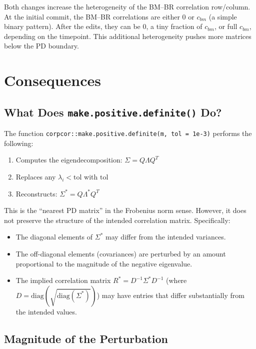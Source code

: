 \documentclass[11pt]{article}
\begin{document}
Both changes increase the heterogeneity of the BM--BR
correlation row/column. At the initial commit, the BM--BR
correlations are either 0 or $c_{bm}$ (a simple binary
pattern). After the edits, they can be 0, a tiny fraction of
$c_{bm}$, or full $c_{bm}$, depending on the timepoint.
This additional heterogeneity pushes more matrices below the
PD boundary.

\section{Consequences}

\subsection{What Does \texttt{make.positive.definite()} Do?}

The function \texttt{corpcor::make.positive.definite(m,
tol = 1e-3)} performs the following:

\begin{enumerate}
\item Computes the eigendecomposition: $\Sigma = Q \Lambda Q^T$
\item Replaces any $\lambda_i < \text{tol}$ with $\text{tol}$
\item Reconstructs: $\Sigma^* = Q \Lambda^* Q^T$
\end{enumerate}

This is the ``nearest PD matrix'' in the Frobenius norm sense.
However, it does not preserve the structure of the intended
correlation matrix. Specifically:

\begin{itemize}
\item The diagonal elements of $\Sigma^*$ may differ from the
  intended variances.
\item The off-diagonal elements (covariances) are perturbed
  by an amount proportional to the magnitude of the negative
  eigenvalue.
\item The implied correlation matrix
  $R^* = D^{-1} \Sigma^* D^{-1}$ (where
  $D = \text{diag}(\sqrt{\text{diag}(\Sigma^*)})$) may have
  entries that differ substantially from the intended values.
\end{itemize}

\subsection{Magnitude of the Perturbation}
\end{document}
